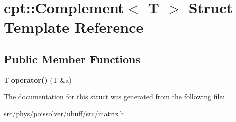 \hypertarget{structcpt_1_1Complement}{}\section{cpt\+:\+:Complement$<$ T $>$ Struct Template Reference}
\label{structcpt_1_1Complement}
\subsection*{Public Member Functions}
\begin{DoxyCompactItemize}
\item 
T {\bfseries operator()} (T \&a)\hypertarget{structcpt_1_1Complement_a3b97b9cbef07c578ab9fbe4a1c171e56}{}\label{structcpt_1_1Complement_a3b97b9cbef07c578ab9fbe4a1c171e56}

\end{DoxyCompactItemize}


The documentation for this struct was generated from the following file\+:\begin{DoxyCompactItemize}
\item 
src/phys/poissolver/ubuff/src/matrix.\+h\end{DoxyCompactItemize}
